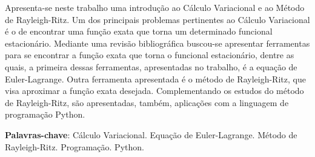 \documentclass[
	12pt,				%
	openright,			%
    twoside,			%
	a4paper,			%
	english,			%
	french,				%
	spanish,			%
	brazil				%
	]{abntex2}
\numberwithin{lema}{chapter}
\numberwithin{teorema}{chapter}
\numberwithin{definicao}{chapter}
\numberwithin{exemplo}{chapter}
\numberwithin{figure}{chapter}
\begin{document}

\setlength{\absparsep}{18pt} %
\begin{resumo}[RESUMO]
Apresenta-se neste trabalho uma introdução ao Cálculo Variacional e ao Método de Rayleigh-Ritz. Um dos principais problemas pertinentes ao Cálculo Variacional é o de encontrar uma função exata que torna um determinado funcional estacionário. Mediante uma revisão bibliográfica buscou-se apresentar ferramentas para se encontrar a função exata que torna o funcional estacionário, dentre as quais, a primeira dessas ferramentas, apresentadas no trabalho, é a equação de Euler-Lagrange. Outra ferramenta apresentada é o método de Rayleigh-Ritz, que visa aproximar a função exata desejada. Complementando os estudos do método de Rayleigh-Ritz, são apresentadas, também, aplicações com a linguagem de programação Python.

\textbf{Palavras-chave}: Cálculo Variacional. Equação de Euler-Lagrange. Método de Rayleigh-Ritz. Programação. Python.
\end{resumo}

\end{document}
